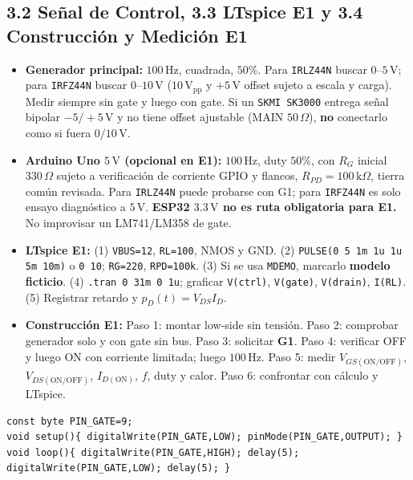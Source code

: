 \documentclass[10pt, a4paper, landscape]{article}
\begin{document}
\subsection*{3.2 Señal de Control, 3.3 LTspice E1 y 3.4 Construcción y Medición E1}
\begin{itemize}[noitemsep, topsep=2pt]
    \item \textbf{Generador principal:} $100\,\text{Hz}$, cuadrada, $50\%$. Para \texttt{IRLZ44N} buscar \textbf{$0\text{--}5\,\text{V}$}; para \texttt{IRFZ44N} buscar \textbf{$0\text{--}10\,\text{V}$} ($10\,\text{V}_{\text{pp}}$ y $+5\,\text{V}$ offset sujeto a escala y carga). Medir siempre sin gate y luego con gate. Si un \texttt{SKMI SK3000} entrega señal bipolar $-5/+5\,\text{V}$ y no tiene offset ajustable (MAIN $50\,\Omega$), \textbf{no} conectarlo como si fuera $0/10\,\text{V}$.
    \item \textbf{Arduino Uno $5\,\text{V}$ (opcional en E1):} $100\,\text{Hz}$, duty $50\%$, con $R_G$ inicial \textbf{$330\,\Omega$} sujeto a verificación de corriente GPIO y flancos, $R_{PD}=100\,\text{k}\Omega$, tierra común revisada. Para \texttt{IRLZ44N} puede probarse con G1; para \texttt{IRFZ44N} es solo ensayo diagnóstico a $5\,\text{V}$. \textbf{ESP32 $3.3\,\text{V}$ no es ruta obligatoria para E1.} No improvisar un LM741/LM358 de gate.
    \item \textbf{LTspice E1:} (1) \texttt{VBUS=12}, \texttt{RL=100}, NMOS y GND. (2) \texttt{PULSE(0 5 1m 1u 1u 5m 10m)} o \texttt{0 10}; \texttt{RG=220}, \texttt{RPD=100k}. (3) Si se usa \texttt{MDEMO}, marcarlo \textbf{modelo ficticio}. (4) \texttt{.tran 0 31m 0 1u}; graficar \texttt{V(ctrl)}, \texttt{V(gate)}, \texttt{V(drain)}, \texttt{I(RL)}. (5) Registrar retardo y $p_D(t)=V_{DS}I_D$.
    \item \textbf{Construcción E1:} Paso 1: montar low-side sin tensión. Paso 2: comprobar generador solo y con gate sin bus. Paso 3: solicitar \textbf{G1}. Paso 4: verificar OFF y luego ON con corriente limitada; luego $100\,\text{Hz}$. Paso 5: medir $V_{GS(\text{ON/OFF})}$, $V_{DS(\text{ON/OFF})}$, $I_{D(\text{ON})}$, $f$, duty y calor. Paso 6: confrontar con cálculo y LTspice.
\end{itemize}

\begin{verbatim}
const byte PIN_GATE=9;
void setup(){ digitalWrite(PIN_GATE,LOW); pinMode(PIN_GATE,OUTPUT); }
void loop(){ digitalWrite(PIN_GATE,HIGH); delay(5); digitalWrite(PIN_GATE,LOW); delay(5); }
\end{verbatim}
\end{document}
